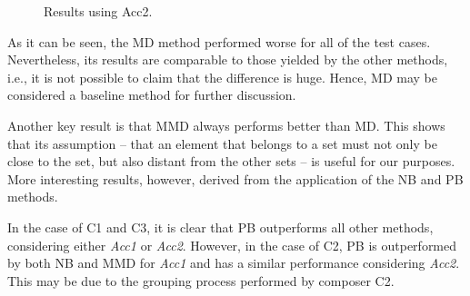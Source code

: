 \documentclass{article}
\begin{document}
\begin{figure}[ht!]
\centering
\caption{Results using Acc2.} 
\label{fig:res_acc2}
\end{figure}

As it can be seen, the MD method performed worse for all of the test
cases. Nevertheless, its results are comparable to those yielded by
the other methods, i.e., it is not possible to claim that the
difference is huge. Hence, MD may be considered a baseline method for
further discussion.

Another key result is that MMD always performs better than MD. This
shows that its assumption -- that an element that belongs to a set
must not only be close to the set, but also distant from the other
sets \cite{Schnitzer2011} -- is useful for our purposes. More
interesting results, however, derived from the application of the NB
and PB methods.

In the case of C1 and C3, it is clear that PB outperforms all other
methods, considering either \textit{Acc1} or \textit{Acc2}. However,
in the case of C2, PB is outperformed by both NB and MMD for
\textit{Acc1} and has a similar performance considering
\textit{Acc2}. This may be due to the grouping process performed by
composer C2.
\end{document}
